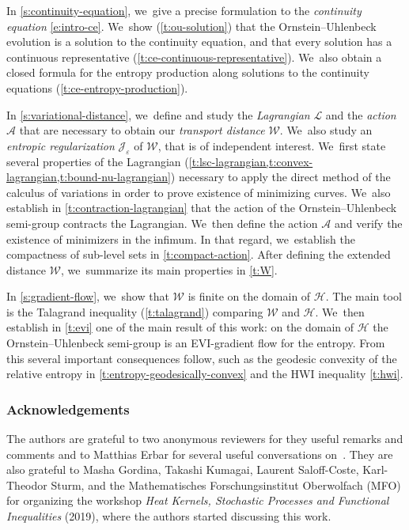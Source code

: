 \documentclass[10pt]{amsart}
\theoremstyle{definition}
\theoremstyle{remark}
\begin{document}
In \cref{s:continuity-equation}, we~give a precise formulation to the \emph{continuity equation} \cref{e:intro-ce}. We~show (\cref{t:ou-solution}) that the Ornstein--Uhlenbeck evolution is a solution to the continuity equation, and that every solution has a continuous representative (\cref{t:ce-continuous-representative}). We~also obtain a closed formula for the entropy production along solutions to the continuity equations (\cref{t:ce-entropy-production}).

In \cref{s:variational-distance}, we~define and study the \emph{Lagrangian} $\mathcal{L}$ and the \emph{action} $\mathcal{A}$ that are necessary to obtain our \emph{transport distance} $\mathcal{W}$. We~also study an \emph{entropic regularization} $\mathcal{J}_{\varepsilon}$ of $\mathcal{W}$, that is of independent interest. We~first state several properties of the Lagrangian (\cref{t:lsc-lagrangian,t:convex-lagrangian,t:bound-nu-lagrangian}) necessary to apply the direct method of the calculus of variations in order to prove existence of minimizing curves. We~also establish in \cref{t:contraction-lagrangian} that the action of the Ornstein--Uhlenbeck semi-group contracts the Lagrangian. We~then define the action $\mathcal{A}$ and verify the existence of minimizers in the infimum.
In that regard, we~establish the compactness of sub-level sets in \cref{t:compact-action}.
After defining the extended distance $\mathcal{W}$, we~summarize its main properties in \cref{t:W}.

In \cref{s:gradient-flow}, we~show that $\mathcal{W}$ is finite on the domain of $\mathcal{H}$.
The main tool is the Talagrand inequality (\cref{t:talagrand}) comparing $\mathcal{W}$ and $\mathcal{H}$. We~then establish in \cref{t:evi} one of the main result of this work: on the domain of $\mathcal{H}$ the Ornstein--Uhlenbeck semi-group is an EVI-gradient flow for the entropy.
From this several important consequences follow, such as the geodesic convexity of the relative entropy in \cref{t:entropy-geodesically-convex} and the HWI inequality \cref{t:hwi}.

\subsubsection*{Acknowledgements}
The authors are grateful to two anonymous reviewers for they useful remarks and comments and to Matthias Erbar for several useful conversations on~\cite{Erbar}.
They are also grateful to Masha Gordina, Takashi Kumagai, Laurent Saloff-Coste, Karl-Theodor Sturm, and the Mathematisches Forschungsinstitut Oberwolfach (MFO) for organizing the workshop \emph{Heat Kernels, Stochastic Processes and Functional Inequalities} (2019), where the authors started discussing this work.
\end{document}
